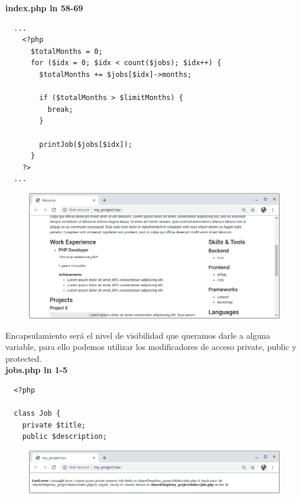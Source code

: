\documentclass{article}
\begin{document}
\textbf{index.php ln 58-69}
\begin{verbatim}
  ...
    <?php
      $totalMonths = 0;
      for ($idx = 0; $idx < count($jobs); $idx++) {
        $totalMonths += $jobs[$idx]->months;

        if ($totalMonths > $limitMonths) {
          break;
        }

        printJob($jobs[$idx]);
      }
    ?>
  ...
\end{verbatim}

\begin{figure}[h!]
  \centering
  \includegraphics[scale=0.5]{./Pictures/039_clases.png}
\end{figure}

Encapsulamiento será el nivel de visibilidad que queramos darle a alguna
variable, para ello podemos utilizar los modificadores de acceso private,
public y protected.\\

\textbf{jobs.php ln 1-5}
\begin{verbatim}
  <?php

  class Job {
    private $title;
    public $description;
\end{verbatim}

\begin{figure}[h!]
  \centering
  \includegraphics[scale=0.5]{./Pictures/040_private.png}
\end{figure}
\end{document}
